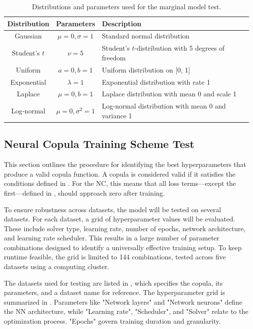 \begin{table}[h]
    \centering
    \caption{Distributions and parameters used for the marginal model test.}
    \begin{tabular}{@{}ccl@{}}
        Distribution & Parameters & Description \\
        \toprule
        Gaussian & $\mu=0, \sigma=1$ & Standard normal distribution \\ 
        Student's $t$ & $\nu=5$ & Student's $t$-distribution with 5 degrees of freedom \\ 
        Uniform & $a=0, b=1$ & Uniform distribution on [0, 1] \\ 
        Exponential & $\lambda=1$ & Exponential distribution with rate 1 \\ 
        Laplace & $\mu=0, b=1$ & Laplace distribution with mean 0 and scale 1 \\ 
        Log-normal & $\mu=0, \sigma^2=1$ & Log-normal distribution with mean 0 and variance 1 \\ 
    \end{tabular}
    \label{tab:distributions}
\end{table}


\subsection{Neural Copula Training Scheme Test}
This section outlines the procedure for identifying the best hyperparameters that produce a valid copula function. A copula is considered valid if it satisfies the conditions defined in . For the \gls{NC}, this means that all loss terms—except the first—defined in , should approach zero after training.

To ensure robustness across datasets, the model will be tested on several datasets. For each dataset, a grid of hyperparameter values will be evaluated. These include solver type, learning rate, number of epochs, network architecture, and learning rate scheduler. This results in a large number of parameter combinations designed to identify a universally effective training setup. To keep runtime feasible, the grid is limited to 144 combinations, tested across five datasets using a computing cluster.

The datasets used for testing are listed in , which specifies the copula, its parameters, and a dataset name for reference. The hyperparameter grid is summarized in . Parameters like "Network layers" and "Network neurons" define the \gls{NN} architecture, while "Learning rate", "Scheduler", and "Solver" relate to the optimization process. "Epochs" govern training duration and granularity.

